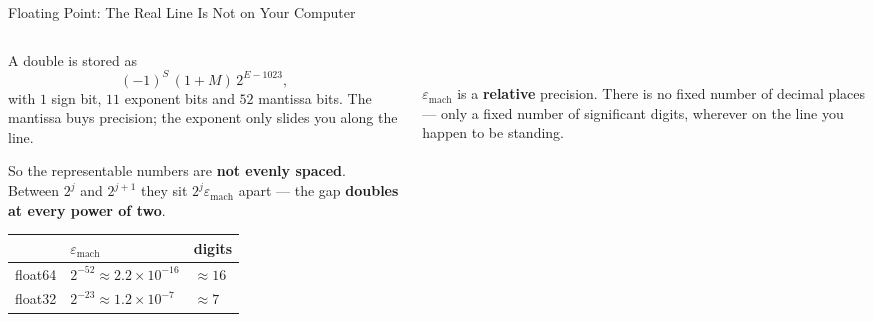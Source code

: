 \begin{frame}{Floating Point: The Real Line Is Not on Your Computer}
\begin{columns}[T]
\begin{column}{0.44\textwidth}
\small
A double is stored as
\[
  (-1)^{S}\,(1+M)\,2^{E-1023},
\]
with $1$ sign bit, $11$ exponent bits and $52$ mantissa bits. The mantissa buys precision; the exponent only slides you along the line.
\medskip

So the representable numbers are \textbf{not evenly spaced}. Between $2^{j}$ and $2^{j+1}$ they sit $2^{j}\varepsilon_{\text{mach}}$ apart --- the gap \textbf{doubles at every power of two}.
\medskip
\begin{center}\footnotesize
\begin{tabular}{@{}lll@{}}
\toprule
 & $\varepsilon_{\text{mach}}$ & digits \\
\midrule
float64 & $2^{-52}\approx2.2\times10^{-16}$ & $\approx16$ \\
float32 & $2^{-23}\approx1.2\times10^{-7}$ & $\approx7$ \\
\bottomrule
\end{tabular}
\end{center}
\end{column}
\begin{column}{0.53\textwidth}
\centering
{}
\\[3mm]
\begin{cautionbox}\footnotesize
$\varepsilon_{\text{mach}}$ is a \textbf{relative} precision. There is no fixed number of decimal places --- only a fixed number of significant digits, wherever on the line you happen to be standing.
\end{cautionbox}
\end{column}
\end{columns}
\vspace{0.5mm}
\end{frame}

